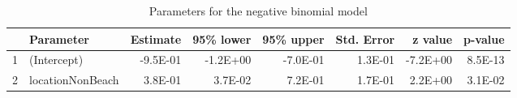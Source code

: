 \begin{table}[ht]
\centering
\caption{Parameters for the negative binomial model} 
\label{tab:NBparms}
\begin{tabular}{rlrrrrrr}
  \hline
 & Parameter & Estimate & 95\% lower & 95\% upper & Std. Error & z value & p-value \\ 
  \hline
1 & (Intercept) & -9.5E-01 & -1.2E+00 & -7.0E-01 & 1.3E-01 & -7.2E+00 & 8.5E-13 \\ 
  2 & locationNonBeach & 3.8E-01 & 3.7E-02 & 7.2E-01 & 1.7E-01 & 2.2E+00 & 3.1E-02 \\ 
   \hline
\end{tabular}
\end{table}
